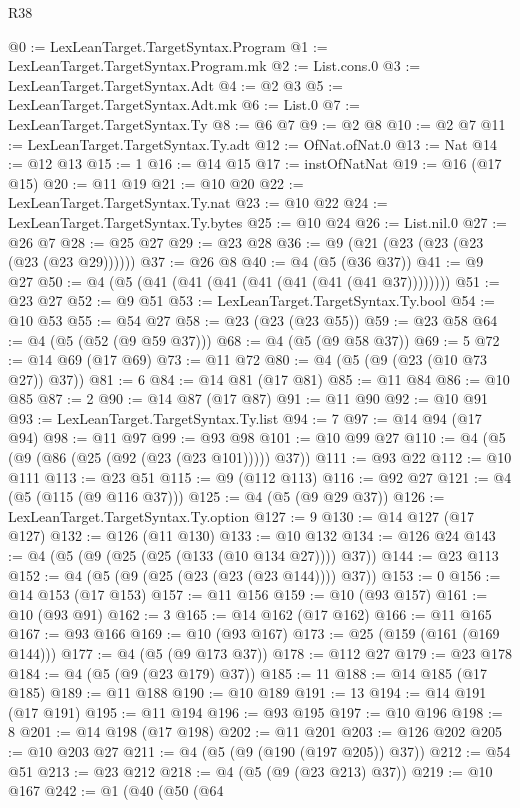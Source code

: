 \begin{lexlean}{R38}
\begin{coremodule}
@0 := LexLeanTarget.TargetSyntax.Program
@1 := LexLeanTarget.TargetSyntax.Program.mk
@2 := List.cons.{0}
@3 := LexLeanTarget.TargetSyntax.Adt
@4 := @2 @3
@5 := LexLeanTarget.TargetSyntax.Adt.mk
@6 := List.{0}
@7 := LexLeanTarget.TargetSyntax.Ty
@8 := @6 @7
@9 := @2 @8
@10 := @2 @7
@11 := LexLeanTarget.TargetSyntax.Ty.adt
@12 := OfNat.ofNat.{0}
@13 := Nat
@14 := @12 @13
@15 := 1
@16 := @14 @15
@17 := instOfNatNat
@19 := @16 (@17 @15)
@20 := @11 @19
@21 := @10 @20
@22 := LexLeanTarget.TargetSyntax.Ty.nat
@23 := @10 @22
@24 := LexLeanTarget.TargetSyntax.Ty.bytes
@25 := @10 @24
@26 := List.nil.{0}
@27 := @26 @7
@28 := @25 @27
@29 := @23 @28
@36 := @9 (@21 (@23 (@23 (@23 (@23 (@23 @29))))))
@37 := @26 @8
@40 := @4 (@5 (@36 @37))
@41 := @9 @27
@50 := @4 (@5 (@41 (@41 (@41 (@41 (@41 (@41 (@41 @37))))))))
@51 := @23 @27
@52 := @9 @51
@53 := LexLeanTarget.TargetSyntax.Ty.bool
@54 := @10 @53
@55 := @54 @27
@58 := @23 (@23 (@23 @55))
@59 := @23 @58
@64 := @4 (@5 (@52 (@9 @59 @37)))
@68 := @4 (@5 (@9 @58 @37))
@69 := 5
@72 := @14 @69 (@17 @69)
@73 := @11 @72
@80 := @4 (@5 (@9 (@23 (@10 @73 @27)) @37))
@81 := 6
@84 := @14 @81 (@17 @81)
@85 := @11 @84
@86 := @10 @85
@87 := 2
@90 := @14 @87 (@17 @87)
@91 := @11 @90
@92 := @10 @91
@93 := LexLeanTarget.TargetSyntax.Ty.list
@94 := 7
@97 := @14 @94 (@17 @94)
@98 := @11 @97
@99 := @93 @98
@101 := @10 @99 @27
@110 := @4 (@5 (@9 (@86 (@25 (@92 (@23 (@23 @101))))) @37))
@111 := @93 @22
@112 := @10 @111
@113 := @23 @51
@115 := @9 (@112 @113)
@116 := @92 @27
@121 := @4 (@5 (@115 (@9 @116 @37)))
@125 := @4 (@5 (@9 @29 @37))
@126 := LexLeanTarget.TargetSyntax.Ty.option
@127 := 9
@130 := @14 @127 (@17 @127)
@132 := @126 (@11 @130)
@133 := @10 @132
@134 := @126 @24
@143 := @4 (@5 (@9 (@25 (@25 (@133 (@10 @134 @27)))) @37))
@144 := @23 @113
@152 := @4 (@5 (@9 (@25 (@23 (@23 (@23 @144)))) @37))
@153 := 0
@156 := @14 @153 (@17 @153)
@157 := @11 @156
@159 := @10 (@93 @157)
@161 := @10 (@93 @91)
@162 := 3
@165 := @14 @162 (@17 @162)
@166 := @11 @165
@167 := @93 @166
@169 := @10 (@93 @167)
@173 := @25 (@159 (@161 (@169 @144)))
@177 := @4 (@5 (@9 @173 @37))
@178 := @112 @27
@179 := @23 @178
@184 := @4 (@5 (@9 (@23 @179) @37))
@185 := 11
@188 := @14 @185 (@17 @185)
@189 := @11 @188
@190 := @10 @189
@191 := 13
@194 := @14 @191 (@17 @191)
@195 := @11 @194
@196 := @93 @195
@197 := @10 @196
@198 := 8
@201 := @14 @198 (@17 @198)
@202 := @11 @201
@203 := @126 @202
@205 := @10 @203 @27
@211 := @4 (@5 (@9 (@190 (@197 @205)) @37))
@212 := @54 @51
@213 := @23 @212
@218 := @4 (@5 (@9 (@23 @213) @37))
@219 := @10 @167
@242 := @1
    (@40
      (@50
        (@64

\end{coremodule}
\end{lexlean}
